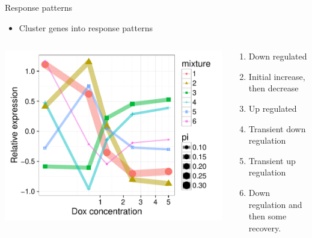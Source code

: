 \documentclass{beamer}
\begin{document}
\begin{frame}{Response patterns}
\begin{itemize}
\item Cluster genes into response patterns
\end{itemize}
\begin{columns}
\begin{column}{.5\textwidth}
\centering
\includegraphics[width=\textwidth,clip,trim=0 0 0 0]{../figures/mixture_centroids.pdf}
\end{column}
\begin{column}{0.5\textwidth}  
\begin{enumerate}
\item Down regulated
\item Initial increase, then decrease
\item Up regulated
\item Transient down regulation
\item Transient up regulation
\item Down regulation and then some recovery. 
\end{enumerate}
\end{column}
\end{columns}
\end{frame}
\end{document}
